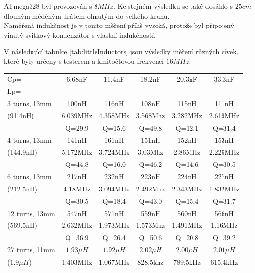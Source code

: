 ATmega328 byl provozován s \(8MHz\). Ke stejném výsledku se také dosáhlo s \(25cm\) dlouhým měděným drátem ohnutým do velkého kruhu.\\
Naměřená indukčnost je v tomto měření příliš vysoká, protože byl připojený vinutý svitkový kondenzátor s vlastní indukčností.

V následující tabulce \ref{tab:littleInductors} jsou výsledky měření různých cívek, které byly určeny s testerem a kmitočtovou frekvencí \(16MHz\).

\begin{table}[H]
\begin{center}
\begin{tabular}{| l | c | c | c | c | c |}
\hline
\hspace{1.5cm} Cp= & 6.68nF    & 11.4nF    & 18.2nF    & 20.3nF    & 33.3nF \\
Lp=           &           &           &           &           &        \\ 
\hline
\hline
3 turns, 13mm & 100nH     & 116nH     & 108nH     & 115nH     & 111nH  \\
 (91.4nH) & 6.039MHz  & 4.358MHz  & 3.568Mhz  & 3.282MHz  & 2.619MHz \\
              & Q=29.9    & Q=15.6    & Q=49.8    & Q=12.1    & Q=31.4  \\
\hline
4 turns, 13mm & 141nH     & 161nH     & 151nH     & 152nH     & 153nH  \\
 (144.9nH)     & 5.172MHz  & 3.724MHz  & 3.03Mhz   & 2.86MHz   & 2.226MHz \\
              & Q=44.8    & Q=16.0    & Q=46.2    & Q=14.6    & Q=30.5  \\
\hline
6 turns, 13mm & 217nH     & 232nH     & 223nH     & 224nH     & 227nH  \\
 (212.5nH)    & 4.18MHz   & 3.094MHz  & 2.492Mhz  & 2.343MHz  & 1.832MHz \\
              & Q=30.5    & Q=18.4    & Q=43.0    & Q=15.4    & Q=31.7  \\
\hline
12 turns, 13mm     & 547nH     & 571nH     & 559nH     & 560nH     & 566nH  \\
 (569.5nH)    & 2.632MHz  & 1.973MHz  & 1.573Mhz  & 1.491MHz  & 1.16MHz \\
              & Q=36.9    & Q=26.4    & Q=50.6    & Q=20.8    & Q=39.2  \\
\hline
27 turns, 11mm & \(1.93\mu H\) & \(1.92\mu H\) & \(2.02\mu H\) & \(2.00\mu H\) & \(2.01\mu H\)  \\
(\(1.9\mu H\)) & 1.403MHz  & 1.067MHz  & 828.5khz  & 789.5kHz  & 615.4kHz \\

\end{tabular}
\end{center}
\end{table}
